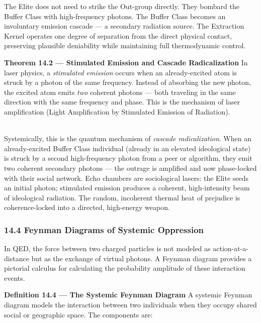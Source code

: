 {The Elite does not need to strike the Out-group directly. They bombard
the Buffer Class with high-frequency photons. The Buffer Class becomes
an involuntary emission cascade --- a secondary radiation source. The
Extraction Kernel operates one degree of separation from the direct
physical contact, preserving plausible deniability while maintaining
full thermodynamic control.

\textbf{Theorem 14.2 --- Stimulated Emission and Cascade Radicalization}
In laser physics, a \emph{stimulated emission} occurs when an
already-excited atom is struck by a photon of the same frequency.
Instead of absorbing the new photon, the excited atom emits \emph{two}
coherent photons --- both traveling in the same direction with the same
frequency and phase. This is the mechanism of laser amplification (Light
Amplification by Stimulated Emission of Radiation).\\
\strut \\
Systemically, this is the quantum mechanism of \emph{cascade
radicalization}. When an already-excited Buffer Class individual
(already in an elevated ideological state) is struck by a second
high-frequency photon from a peer or algorithm, they emit two coherent
secondary photons --- the outrage is amplified and now phase-locked with
their social network. Echo chambers are sociological lasers: the Elite
seeds an initial photon; stimulated emission produces a coherent,
high-intensity beam of ideological radiation. The random, incoherent
thermal heat of prejudice is coherence-locked into a directed,
high-energy weapon.

\subsubsection{14.4 Feynman Diagrams of Systemic
Oppression}\label{feynman-diagrams-of-systemic-oppression}

In QED, the force between two charged particles is not modeled as
action-at-a-distance but as the exchange of virtual photons. A Feynman
diagram provides a pictorial calculus for calculating the probability
amplitude of these interaction events.

\textbf{Definition 14.4 --- The Systemic Feynman Diagram} A systemic
Feynman diagram models the interaction between two individuals when they
occupy shared social or geographic space. The components are:

}
